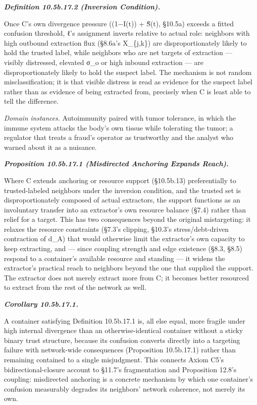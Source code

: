 \documentclass[
]{article}
\begin{document}
\emph{\textbf{Definition 10.5b.17.2 (Inversion Condition).}}

Once C's own divergence pressure ((1−I(t)) + S̃(t), §10.5a) exceeds a
fitted confusion threshold, ℓ's assignment inverts relative to actual
role: neighbors with high outbound extraction flux (§8.6a's X\_\{j,k\})
are disproportionately likely to hold the trusted label, while neighbors
who are net targets of extraction --- visibly distressed, elevated σ\_o
or high inbound extraction --- are disproportionately likely to hold the
suspect label. The mechanism is not random misclassification; it is that
visible distress is read as evidence for the suspect label rather than
as evidence of being extracted from, precisely when C is least able to
tell the difference.

\emph{Domain instances.} Autoimmunity paired with tumor tolerance, in
which the immune system attacks the body's own tissue while tolerating
the tumor; a regulator that treats a fraud's operator as trustworthy and
the analyst who warned about it as a nuisance.

\emph{\textbf{Proposition 10.5b.17.1 (Misdirected Anchoring Expands
Reach).}}

Where C extends anchoring or resource support (§10.5b.13) preferentially
to trusted-labeled neighbors under the inversion condition, and the
trusted set is disproportionately composed of actual extractors, the
support functions as an involuntary transfer into an extractor's own
resource balance (§7.4) rather than relief for a target. This has two
consequences beyond the original mistargeting: it relaxes the resource
constraints (§7.3's clipping, §10.3's stress/debt-driven contraction of
d\_A) that would otherwise limit the extractor's own capacity to keep
extracting, and --- since coupling strength and edge existence (§8.3,
§8.5) respond to a container's available resource and standing --- it
widens the extractor's practical reach to neighbors beyond the one that
supplied the support. The extractor does not merely extract more from C;
it becomes better resourced to extract from the rest of the network as
well.

\emph{\textbf{Corollary 10.5b.17.1.}}

A container satisfying Definition 10.5b.17.1 is, all else equal, more
fragile under high internal divergence than an otherwise-identical
container without a sticky binary trust structure, because its confusion
converts directly into a targeting failure with network-wide
consequences (Proposition 10.5b.17.1) rather than remaining contained to
a single misjudgment. This connects Axiom C5's bidirectional-closure
account to §11.7's fragmentation and Proposition 12.8's coupling:
misdirected anchoring is a concrete mechanism by which one container's
confusion measurably degrades its neighbors' network coherence, not
merely its own.
\end{document}
